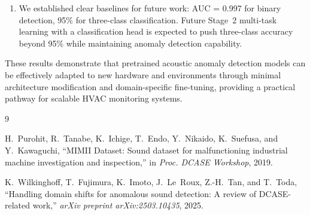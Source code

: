 \documentclass[12pt, a4paper]{article}
\begin{document}
\begin{enumerate}
    \item We established clear baselines for future work: AUC = 0.997 for binary detection, 95\% for three-class classification. Future Stage~2 multi-task learning with a classification head is expected to push three-class accuracy beyond 95\% while maintaining anomaly detection capability.
\end{enumerate}

These results demonstrate that pretrained acoustic anomaly detection models can be effectively adapted to new hardware and environments through minimal architecture modification and domain-specific fine-tuning, providing a practical pathway for scalable HVAC monitoring systems.


\begin{thebibliography}{9}

H.~Purohit, R.~Tanabe, K.~Ichige, T.~Endo, Y.~Nikaido, K.~Suefusa, and Y.~Kawaguchi,
``MIMII Dataset: Sound dataset for malfunctioning industrial machine investigation and inspection,''
in \textit{Proc. DCASE Workshop}, 2019.

K.~Wilkinghoff, T.~Fujimura, K.~Imoto, J.~Le~Roux, Z.-H.~Tan, and T.~Toda,
``Handling domain shifts for anomalous sound detection: A review of DCASE-related work,''
\textit{arXiv preprint arXiv:2503.10435}, 2025.

\end{thebibliography}
\end{document}
